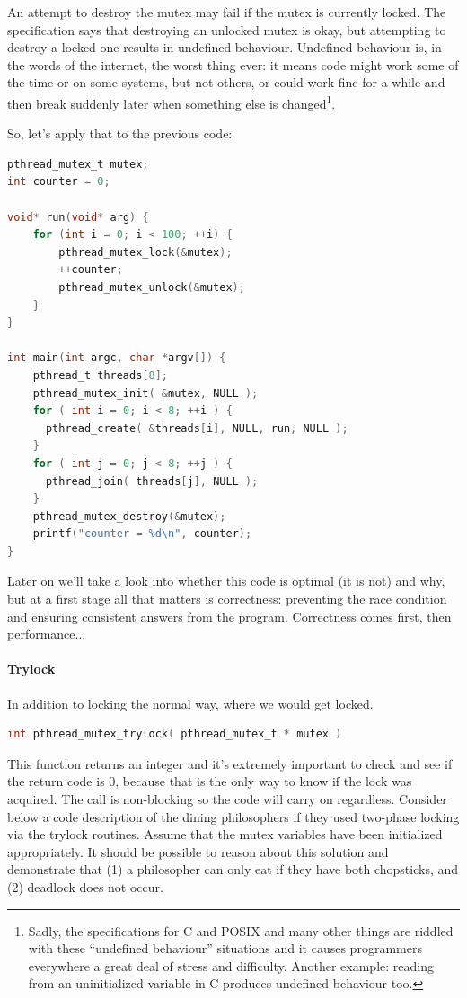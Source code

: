 \documentclass[a4paper]{report}
\begin{document}
\begin{appendices}
An attempt to destroy the mutex may fail if the mutex is currently locked. The specification says that destroying an unlocked mutex is okay, but attempting to destroy a locked one results in undefined behaviour. Undefined behaviour is, in the words of the internet, the worst thing ever: it means code might work some of the time or on some systems, but not others, or could work fine for a while and then break suddenly later when something else is changed\footnote{Sadly, the specifications for C and POSIX and many other things are riddled with these ``undefined behaviour'' situations and it causes programmers everywhere a great deal of stress and difficulty. Another example: reading from an uninitialized variable in C produces undefined behaviour too.}.


So, let's apply that to the previous code:
\begin{lstlisting}[language=C]
pthread_mutex_t mutex;
int counter = 0;

void* run(void* arg) {
    for (int i = 0; i < 100; ++i) {
        pthread_mutex_lock(&mutex);
        ++counter;
        pthread_mutex_unlock(&mutex);
    }
}

int main(int argc, char *argv[]) {
    pthread_t threads[8];
    pthread_mutex_init( &mutex, NULL );
    for ( int i = 0; i < 8; ++i ) {
      pthread_create( &threads[i], NULL, run, NULL );
    }
    for ( int j = 0; j < 8; ++j ) {
      pthread_join( threads[j], NULL );
    }
    pthread_mutex_destroy(&mutex);
    printf("counter = %d\n", counter);
}
\end{lstlisting}

Later on we'll take a look into whether this code is optimal (it is not) and why, but at a first stage all that matters is correctness: preventing the race condition and ensuring consistent answers from the program. Correctness comes first, then performance...

\paragraph{Trylock}

In addition to locking the normal way, where we would get locked. 

\begin{lstlisting}[language=C]
int pthread_mutex_trylock( pthread_mutex_t * mutex )
\end{lstlisting}

This function returns an integer and it's extremely important to check and see if the return code is 0, because that is the only way to know if the lock was acquired. The call is non-blocking so the code will carry on regardless. Consider below a code description of the dining philosophers if they used two-phase locking via the trylock routines. Assume that the mutex variables have been initialized appropriately. It should be possible to reason about this solution and demonstrate that (1) a philosopher can only eat if they have both chopsticks, and (2) deadlock does not occur.


\end{appendices}
\end{document}
